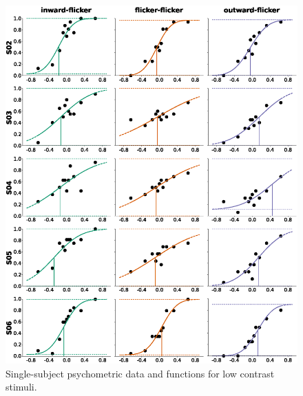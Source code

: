 \begin{figure}[htbp!]
\centering
\includegraphics[width=\textwidth]{figures/chapter_04_SI/figG_lowCnt.eps}
\caption{Single-subject psychometric data and functions for low contrast stimuli.}
\label{fig:psyphySglSbj_lowCnt}
\end{figure}

